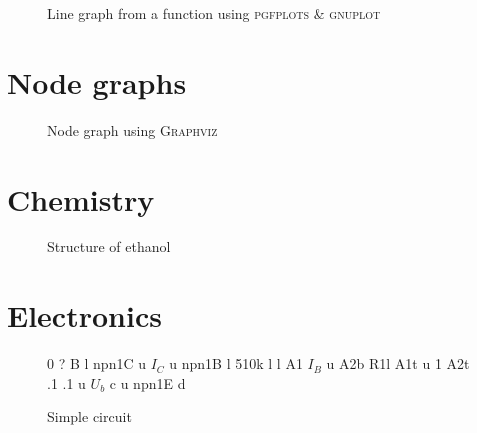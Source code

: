 \documentclass[11pt,a4paper]{article}
\begin{document}
\begin{figure}[H]
\centering
{}
\caption{Line graph from a function using \textsc{pgfplots} \& \textsc{gnuplot}}
\end{figure}

\section{Node graphs}
\begin{figure}[H]
\centering
{}
\caption{Node graph using \textsc{Graphviz}}
\end{figure}

\section{Chemistry}
\begin{figure}[H]
\centering
{}
\caption{Structure of ethanol}
\end{figure}

\section{Electronics}

\begin{figure}[H]
\centering
\begin{circuit}0
 {?} B l               %
\frompin npn1C              %
 u                      %
\nl{} {$I_C$} u            %
\atpin npn1B                %
 l                      %
 {510k} l                %
 l                      %
\centerto A1                %
\nl{} {$I_B$} u            %
\frompin A2b                %
\vtopin R1l
\frompin A1t
 u
\.1                         %
\frompin A2t                %
\vtopin .1
\htopin .1
 u
\cc{} {$U_b$} c u %
\frompin npn1E
 d
\end{circuit}
\caption{Simple circuit}
\label{circuit}
\end{figure}
\end{document}
